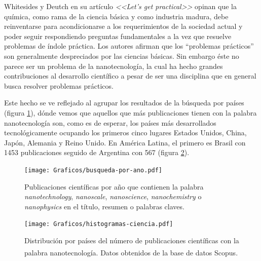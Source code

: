 	 Whitesides y Deutch en su artículo \textit{<<Let's get practical>>}\cite{Burdass2010} opinan que la química, como rama de la ciencia básica y como industria madura, debe reinventarse para acondicionarse a los requerimientos de la sociedad actual y poder seguir respondiendo preguntas fundamentales a la vez que resuelve problemas de índole práctica. Los autores afirman que los ``problemas prácticos'' son generalmente despreciados por las ciencias básicas.  Sin embargo éste no parece ser un problema de la nanotecnología, la cual ha hecho grandes contribuciones al desarrollo científico a pesar de ser una disciplina que en general busca resolver problemas prácticos.
			

	 \pagebreak Este hecho se ve reflejado al agrupar los resultados de la búsqueda por países (figura \ref{fig:publicaciones-ano}), dónde vemos que aquellos que más publicaciones tienen con la palabra nanotecnología son, como es de esperar, los países más desarrollados tecnológicamente ocupando los primeros cinco lugares Estados Unidos, China, Japón, Alemania y Reino Unido. En América Latina, el primero es Brasil con 1453 publicaciones seguido de Argentina con 567 (figura \ref{fig:paises}).


 			\begin{figure}[t!]
 			\begin{center}
 			\hspace{0.3cm}\texttt{[image: Graficos/busqueda-por-ano.pdf]}
 			\vspace*{-0.6cm}
 			\caption[Publicaciones por año en nanotecnología]{Publicaciones científicas por año que contienen la palabra \textit{nanotechnology}, \textit{nanoscale}, \textit{nanoscience}, \textit{nanochemistry} o \textit{nanophysics} en el título, resumen o palabras claves.}
 			\label{fig:publicaciones-ano}
 			\vspace*{-0.2cm} 		    
 			\end{center}
 		    \end{figure}

			\begin{figure}[b!]
 				\begin{center}
 				\texttt{[image: Graficos/histogramas-ciencia.pdf]}
 				\vspace*{-0.4cm}
 				\caption[Nanotecnología por países]{Distribución por países del número de publicaciones científicas con la palabra nanotecnología. Datos obtenidos de la base de datos Scopus\textsuperscript\textregistered.}
 				\label{fig:paises}
 		    	\end{center}
 		    	\end{figure}

